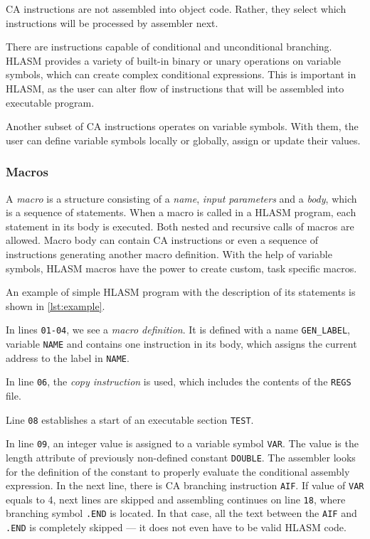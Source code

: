 CA instructions are not assembled into object code. Rather, they select which instructions will be processed by assembler next.

There are instructions capable of conditional and unconditional branching. HLASM provides a variety of built-in binary or unary operations on variable symbols, which can create complex conditional expressions. This is important in HLASM, as the user can alter flow of instructions that will be assembled into executable program.

Another subset of CA instructions operates on variable symbols. With them, the user can define variable symbols locally or globally, assign or update their values.

\subsubsection{Macros}

A \emph{macro} is a structure consisting of a \emph{name}, \emph{input parameters} and a \emph{body}, which is a sequence of statements. When a macro is called in a HLASM program, each statement in its body is executed. Both nested and recursive calls of macros are allowed. Macro body can contain CA instructions or even a sequence of instructions generating another macro definition. With the help of variable symbols, HLASM macros have the power to create custom, task specific macros.

\vspace{5mm}

An example of simple HLASM program with the description of its statements is shown in \cref{lst:example}.

In lines \verb|01-04|, we see a \emph{macro definition}. It is defined with a name \verb|GEN_LABEL|, variable \verb|NAME| and contains one instruction in its body, which assigns the current address to the label in \verb|NAME|.

In line \verb|06|, the \emph{copy instruction} is used, which includes the contents of the \verb|REGS| file.

Line \verb|08| establishes a start of an executable section \verb|TEST|. 

In line \verb|09|, an integer value is assigned to a variable symbol \verb|VAR|. The value is the length attribute of previously non-defined constant \verb|DOUBLE|. The assembler looks for the definition of the constant to properly evaluate the conditional assembly expression. In the next line, there is CA branching instruction \verb|AIF|. If value of \verb|VAR| equals to 4, next lines are skipped and assembling continues on line \verb|18|, where branching symbol \verb|.END| is located. In that case, all the text between the \verb|AIF| and \verb|.END| is completely skipped --- it does not even have to be valid HLASM code.

